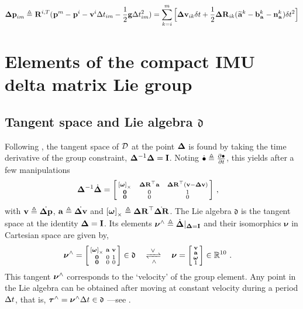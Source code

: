 \begin{equation}
    {\bm \Delta {\bf p}}_{im} \triangleq \prescript{}{}{{\bf R}}_{}^{i,T}(\prescript{}{}{{\bf p}}_{}^m - \prescript{}{}{{\bf p}}_{}^i - \prescript{}{}{{\bf v}}_{}^i \Delta t_{im} - \frac{1}{2} {\bf g} \Delta t_{im}^2) = 
    \sum_{k=i}^{m} \Big[{\bm \Delta {\bf v}}_{ik}\delta t +  \frac{1}{2} {\bm \Delta {\bf R}}_{ik} (\prescript{}{}{\widetilde{{\bf a}}}_{}^k - {\bf b}_{\prescript{}{}{{\bf a}}_{}}^k - {\bf n}_{\prescript{}{}{{\bf a}}_{}}^k)\delta t^2 \Big]
\end{equation}


\section{Elements of the compact IMU delta matrix Lie group}
\label{sec:IMULieGroup}

\subsection{Tangent space and Lie algebra \texorpdfstring{$\mathfrak{d}$}{d}}
\cite{sola2018micro}
Following \cite{sola2018micro}, the tangent space of $\mathcal{D}$ at the point ${{\bm \Delta}}$ is found by taking the time derivative of the group constraint, ${{\bm \Delta}}^{-1}{{\bm \Delta}} = {\bf I}$.
Noting $\dot{\bullet} \triangleq \frac{\partial\bullet}{\partial t}$, this yields 
after a few manipulations
%
\begin{align}\label{eq:constr}
{{\bm \Delta}}^{-1}\dot{{{\bm \Delta}}} 
&=
\begin{bsmallmatrix}
\left[{{\bm \omega}}\right]_\times & ~~{\bm \Delta {\bf R}}^{\top}{\bf a}~~ & {\bm \Delta {\bf R}}^{\top}({\bf v}-{\bm \Delta {\bf v}}) \\
\bf0 & 0 & 1 \\
\bf0 & 0 & 0 
\end{bsmallmatrix}
~,
\end{align}
%
with ${\bf v} \triangleq \dot{{\bm \Delta {\bf p}}}$, ${\bf a} \triangleq \dot{{\bm \Delta {\bf v}}}$ and $\left[{{\bm \omega}}\right]_\times \triangleq {\bm \Delta {\bf R}}^{\top}\dot{{\bm \Delta {\bf R}}}$.
The Lie algebra $\mathfrak{d}$ is the tangent space at the identity ${{\bm \Delta}}={\bf I}$.
Its elements $\bm\nu^\wedge 
\triangleq \dot{{{\bm \Delta}}} |_{{{\bm \Delta}}={\bf I}}$ and their isomorphics $\bm\nu$ in Cartesian space are given by, %
%
\begin{align}
\bm\nu\hhat 
&=
\begin{bsmallmatrix}
\hatx{\bw} & \bfa & \bfv \\
\bf0 & 0 & 1 \\
\bf0 & 0 & 0 
\end{bsmallmatrix} \in \mathfrak{d}
~~~\xrightleftharpoons[\wedge]{~\vee~}~~~ 
\bm\nu=\begin{bsmallmatrix}
\bfv \\ \bfa \\ \bw \\ 1
\end{bsmallmatrix} \in\bbR^{10}
~.
\end{align}
%
This tangent $\bm\nu^\wedge$ corresponds to the `velocity' of the group element. 
Any point in the Lie algebra can be obtained after moving at constant velocity during a period $\Delta t$, that is, ${\bm \tau}^\wedge=\bm\nu^\wedge\Delta t\in\mathfrak{d}$ ---see .
%
